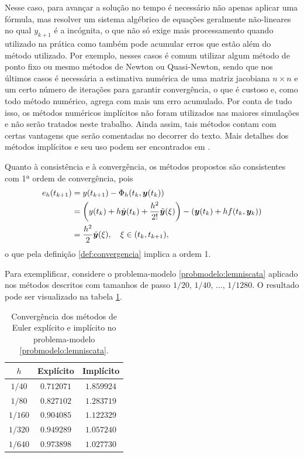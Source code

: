 Nesse caso, para avançar a solução no tempo é necessário não apenas aplicar uma fórmula, mas resolver um sistema algébrico de equações geralmente não-lineares no qual $y_{k+1}$ é a incógnita, o que não só exige mais processamento quando utilizado na prática como também pode acumular erros que estão além do método utilizado. Por exemplo, nesses casos é comum utilizar algum método de ponto fixo ou mesmo métodos de Newton ou Quasi-Newton, sendo que nos últimos casos é necessária a estimativa numérica de uma matriz jacobiana $n \times n$ e um certo número de iterações para garantir convergência, o que é custoso e, como todo método numérico, agrega com mais um erro acumulado. Por conta de tudo isso, os métodos numéricos implícitos não foram utilizados nas maiores simulações e não serão tratados neste trabalho. Ainda assim, tais métodos contam com certas vantagens que serão comentadas no decorrer do texto. Mais detalhes dos métodos implícitos e seu uso podem ser encontrados em \cite{Hairer2006-oz}.

Quanto à consistência e à convergência, os métodos propostos são consistentes com 1ª ordem de convergência, pois
\begin{align*}
    e_h(t_{k+1}) 
    &= y(t_{k+1}) - \Phi_h(t_k, \bm y(t_k)) \\
    &= \left(y(t_k) + h \dot {\bm y}(t_k) + \dfrac{h^2}{2!} \ddot {\bm y}(\xi)\right) - \left( \bm y(t_k) + h f(t_k, \bm y_k) \right) \\
    & = \dfrac{h^2}{2} \ddot {\bm y}(\xi),
    \quad
    \xi \in (t_k, t_{k+1}),
\end{align*}
o que pela definição \ref{def:convergencia} implica a ordem 1.

Para exemplificar, considere o problema-modelo \ref{probmodelo:lemniscata} aplicado nos métodos descritos com tamanhos de passo $1/20$, $1/40$, ..., $1/1280$. O resultado pode ser visualizado na tabela \ref{tab:euler_exp_imp_lemniscata}.

\begin{table}[]
    \centering
    \begin{tabular}{c|cc}
        $h$      & Explícito & Implícito   \\
        \hline
        $1/40$   & $0.712071$ & $1.859924$ \\
        $1/80$   & $0.827102$ & $1.283719$ \\
        $1/160$  & $0.904085$ & $1.122329$ \\
        $1/320$  & $0.949289$ & $1.057240$ \\
        $1/640$  & $0.973898$ & $1.027730$ \\
    \end{tabular}
    \caption{Convergência dos métodos de Euler explícito e implícito no problema-modelo \ref{probmodelo:lemniscata}.}
    \label{tab:euler_exp_imp_lemniscata}
\end{table}


